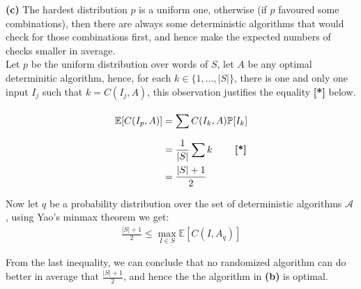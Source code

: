 \documentclass{article}
\def\P{\mathbb{P}}
\def\E{\mathbb{E}}
\begin{document}
\noindent

\textbf{(c)} The hardest distribution $p$ is a uniform one, otherwise (if $p$ favoured some combinations), then there are always some deterministic algorithms that would check for those combinations first, and hence make the expected numbers of checks smaller in average. \\

Let $p$ be the uniform distribution over words of $S$, let $A$ be any optimal determinitic algorithm, hence, for each $k \in \{1, \dots, |S|\}$, there is one and only one input $I_j$ such that $k = C(I_j, A)$, this observation justifies the equality \textbf{[*]} below.

\begin{align*}
    \E[C(I_p, A)] &= \sum_{}^{} C(I_k, A) \P[I_k] \\
                  &= \frac{1}{|S|} \sum k  \textbf{\quad \quad [*]}\\
                  &= \frac{|S|+1}{2} \\
\end{align*}


Now let $q$ be a probability distribution over the set of deterministic algorithms $\mathcal{A}$ , using Yao's minmax theorem we get:
\begin{align*}
   \frac{|S|+1}{2}  \leq  \max_{I \in S} \E[C(I, A_q)]
\end{align*}

From the last inequality, we can conclude that no randomized algorithm can do better in average that $\frac{|S|+1}{2}$, and hence the the algorithm in \textbf{(b)} is optimal.
\end{document}
